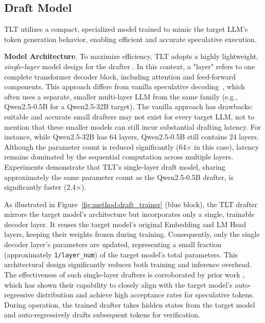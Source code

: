 \documentclass[sigplan,screen]{acmart}
\newcommand{\SysName}{\textrm{TLT}\xspace}
\begin{document}
\vspace{-5pt}
\subsection{Draft Model}
\label{subsec_learning_based_drafter}
\SysName utilizes a compact, specialized model trained to mimic the target LLM's token generation behavior, enabling efficient and accurate speculative execution.


\noindent\textbf{Model Architecture}.
To maximize efficiency, \SysName adopts a highly lightweight, \emph{single-layer} model design for the drafter \cite{Eagle1, HASS,Eagle3}. In this context, a "layer" refers to one complete transformer decoder block, including attention and feed-forward components. This approach differs from vanilla speculative decoding~\cite{SpeculativeDecoding, chen2023accelerating}, which often uses a separate, smaller multi-layer LLM from the same family (e.g., Qwen2.5-0.5B for a Qwen2.5-32B target). The vanilla approach has drawbacks: suitable and accurate small drafters may not exist for every target LLM, not to mention that these smaller models can still incur substantial drafting latency. For instance, while Qwen2.5-32B has 64 layers, Qwen2.5-0.5B still contains 24 layers. Although the parameter count is reduced significantly (64$\times$ in this case), latency remains dominated by the sequential computation across multiple layers. Experiments demonstrate that \SysName's single-layer draft model, sharing approximately the same parameter count as the Qwen2.5-0.5B drafter, is significantly faster (2.4$\times$).
%



As illustrated in Figure~\ref{fig:method:draft_trainer} (blue block), the \SysName drafter mirrors the target model's architecture but incorporates only a single, trainable decoder layer. It reuses the target model's original Embedding and LM Head layers, keeping their weights frozen during training. Consequently, only the single decoder layer's parameters are updated, representing a small fraction (approximately \texttt{1/layer\_num}) of the target model's total parameters. This architectural design significantly reduces both training and inference overhead. The effectiveness of such single-layer drafters is corroborated by prior work \cite{HASS, Eagle1, Eagle2, Eagle3, Falcon, Hydra}, which has shown their capability to closely align with the target model's auto-regressive distribution and achieve high acceptance rates for speculative tokens. During operation, the trained drafter takes hidden states from the target model and auto-regressively drafts subsequent tokens for verification.
\end{document}
